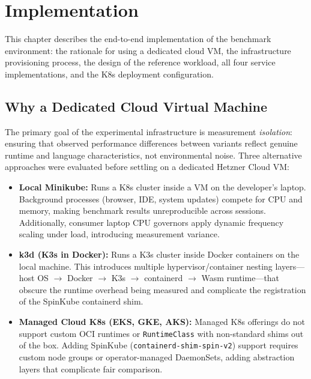 \chapter{Implementation}
\label{chap:implementation}

This chapter describes the end-to-end implementation of the benchmark environment: the rationale for using a dedicated cloud \acs{VM}, the infrastructure provisioning process, the design of the reference workload, all four service implementations, and the \acs{K8s} deployment configuration.

\section{Why a Dedicated Cloud Virtual Machine}
\label{sec:infra_rationale}

The primary goal of the experimental infrastructure is measurement \textit{isolation}: ensuring that observed performance differences between variants reflect genuine runtime and language characteristics, not environmental noise. Three alternative approaches were evaluated before settling on a dedicated Hetzner Cloud \acs{VM}:

\begin{itemize}
    \item \textbf{Local Minikube:} Runs a \acs{K8s} cluster inside a \acs{VM} on the developer's laptop. Background processes (browser, IDE, system updates) compete for \acs{CPU} and memory, making benchmark results unreproducible across sessions. Additionally, consumer laptop \acs{CPU} governors apply dynamic frequency scaling under load, introducing measurement variance.
    \item \textbf{k3d (K3s in Docker):} Runs a K3s cluster inside Docker containers on the local machine. This introduces multiple hypervisor/container nesting layers---host \acs{OS} $\to$ Docker $\to$ K3s $\to$ containerd $\to$ \acs{Wasm} runtime---that obscure the runtime overhead being measured and complicate the registration of the SpinKube containerd shim.
    \item \begin{sloppypar}\textbf{Managed Cloud \acs{K8s} (EKS, GKE, AKS):} Managed \acs{K8s} offerings do not support custom \acs{OCI} runtimes or \texttt{RuntimeClass} with non-standard shims out of the box. Adding SpinKube (\texttt{containerd-shim-spin-v2}) support requires custom node groups or operator-managed DaemonSets, adding abstraction layers that complicate fair comparison.\end{sloppypar}
\end{itemize}

